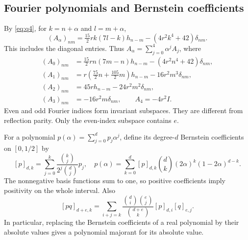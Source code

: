 \documentclass[a4paper,11pt]{article}
\numberwithin{equation}{section}
\theoremstyle{definition}
\theoremstyle{remark}
\begin{document}
\subsection{Fourier polynomials and Bernstein coefficients}
By \eqref{eq:q4}, for $k=n+\alpha$ and $l=m+\alpha$,
\begin{equation}\label{eq:bloch-simple}
 (A_\alpha)_{nm}=\tfrac{15}{2}r k(7l-k)h_{n-m}
 -(4r^2k^4+42)\delta_{nm}.
\end{equation}
This includes the diagonal entries. Thus $A_\alpha=\sum_{j=0}^4\alpha^jA_j$, where
\begin{equation}\label{eq:Aj}
\begin{aligned}
 (A_0)_{nm}&=\tfrac{15}{2}rn(7m-n)h_{n-m}-(4r^2n^4+42)\delta_{nm},\\
 (A_1)_{nm}&=r(\tfrac{75}{2}n+\tfrac{105}{2}m)h_{n-m}-16r^2m^3\delta_{nm},\\
 (A_2)_{nm}&=45rh_{n-m}-24r^2m^2\delta_{nm},\\
 (A_3)_{nm}&=-16r^2m\delta_{nm},\qquad A_4=-4r^2I.
\end{aligned}
\end{equation}
Even and odd Fourier indices form invariant subspaces. They are different from reflection parity. Only the even-index subspace contains $e$.

For a polynomial $p(\alpha)=\sum_{j=0}^dp_j\alpha^j$, define its degree-$d$ Bernstein coefficients on $[0,1/2]$ by
\begin{equation}\label{eq:Bernstein}
 [p]_{d,k}=\sum_{j=0}^k\frac{\binom{k}{j}}{2^j\binom{d}{j}}p_j,
 \quad
 p(\alpha)=\sum_{k=0}^d[p]_{d,k}\binom dk(2\alpha)^k(1-2\alpha)^{d-k}.
\end{equation}
The nonnegative basis functions sum to one, so positive coefficients imply positivity on the whole interval. Also
\begin{equation}\label{eq:Bernstein-product}
 [pq]_{d+e,k}=\sum_{i+j=k}\frac{\binom di\binom ej}{\binom{d+e}k}
 [p]_{d,i}[q]_{e,j}.
\end{equation}
In particular, replacing the Bernstein coefficients of a real polynomial by their absolute values gives a polynomial majorant for its absolute value.
\end{document}
